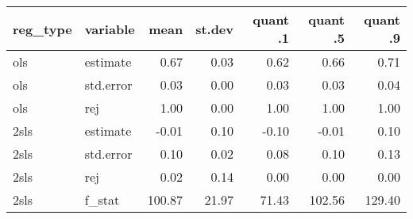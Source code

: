 \begin{tabular}{llrrrrr}
  \hline
reg\_type & variable & mean & st.dev & quant .1 & quant .5 & quant .9 \\ 
  \hline
ols & estimate & 0.67 & 0.03 & 0.62 & 0.66 & 0.71 \\ 
  ols & std.error & 0.03 & 0.00 & 0.03 & 0.03 & 0.04 \\ 
  ols & rej & 1.00 & 0.00 & 1.00 & 1.00 & 1.00 \\ 
  2sls & estimate & -0.01 & 0.10 & -0.10 & -0.01 & 0.10 \\ 
  2sls & std.error & 0.10 & 0.02 & 0.08 & 0.10 & 0.13 \\ 
  2sls & rej & 0.02 & 0.14 & 0.00 & 0.00 & 0.00 \\ 
  2sls & f\_stat & 100.87 & 21.97 & 71.43 & 102.56 & 129.40 \\ 
   \hline
\end{tabular}
